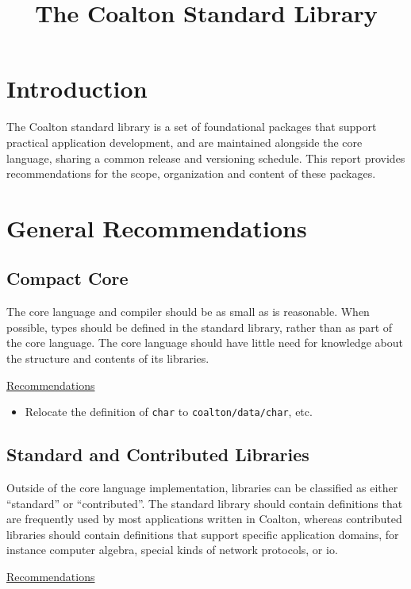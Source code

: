 \documentclass[12pt]{article}
\title{The Coalton Standard Library}
\newcommand{\code}{\texttt}
\begin{document}
\maketitle
\section{Introduction}
The Coalton standard library is a set of foundational packages that
support practical application development, and are maintained alongside
the core language, sharing a common release and versioning
schedule. This report provides recommendations for the scope,
organization and content of these packages.

\section{General Recommendations}

\subsection{Compact Core}

The core language and compiler should be as small as is reasonable.
When possible, types should be defined in the standard library, rather
than as part of the core language. The core language should have
little need for knowledge about the structure and contents of its
libraries.

\bigskip
\underline{Recommendations}

\begin{itemize}
\item Relocate the definition of \code{char} to
  \code{coalton/data/char}, etc.
\end{itemize}

\subsection{Standard and Contributed Libraries}

Outside of the core language implementation, libraries can be
classified as either ``standard'' or ``contributed''.  The standard
library should contain definitions that are frequently used by most
applications written in Coalton, whereas contributed libraries should
contain definitions that support specific application domains, for
instance computer algebra, special kinds of network protocols, or io.

\bigskip
\underline{Recommendations}
\end{document}
